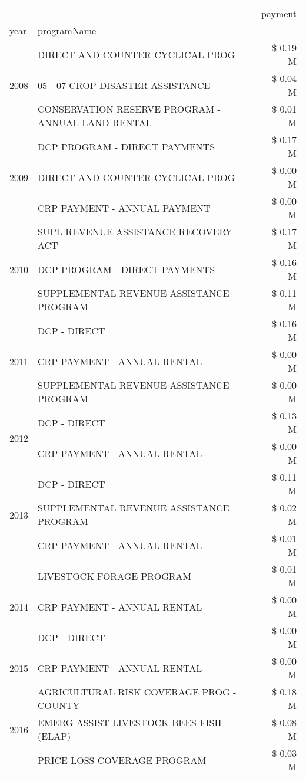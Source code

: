 \begin{tabular}{llr}
\toprule
 &  & payment \\
year & programName &  \\
\midrule
\multirow[t]{3}{*}{2008} & DIRECT AND COUNTER CYCLICAL PROG & \$ 0.19 M \\
 & 05 - 07 CROP DISASTER ASSISTANCE & \$ 0.04 M \\
 & CONSERVATION RESERVE PROGRAM - ANNUAL LAND RENTAL & \$ 0.01 M \\
\cline{1-3}
\multirow[t]{3}{*}{2009} & DCP PROGRAM - DIRECT PAYMENTS & \$ 0.17 M \\
 & DIRECT AND COUNTER CYCLICAL PROG & \$ 0.00 M \\
 & CRP PAYMENT - ANNUAL PAYMENT & \$ 0.00 M \\
\cline{1-3}
\multirow[t]{3}{*}{2010} & SUPL REVENUE ASSISTANCE RECOVERY ACT & \$ 0.17 M \\
 & DCP PROGRAM - DIRECT PAYMENTS & \$ 0.16 M \\
 & SUPPLEMENTAL REVENUE ASSISTANCE PROGRAM & \$ 0.11 M \\
\cline{1-3}
\multirow[t]{3}{*}{2011} & DCP - DIRECT & \$ 0.16 M \\
 & CRP PAYMENT - ANNUAL RENTAL & \$ 0.00 M \\
 & SUPPLEMENTAL REVENUE ASSISTANCE PROGRAM & \$ 0.00 M \\
\cline{1-3}
\multirow[t]{2}{*}{2012} & DCP - DIRECT & \$ 0.13 M \\
 & CRP PAYMENT - ANNUAL RENTAL & \$ 0.00 M \\
\cline{1-3}
\multirow[t]{3}{*}{2013} & DCP - DIRECT & \$ 0.11 M \\
 & SUPPLEMENTAL REVENUE ASSISTANCE PROGRAM & \$ 0.02 M \\
 & CRP PAYMENT - ANNUAL RENTAL & \$ 0.01 M \\
\cline{1-3}
\multirow[t]{3}{*}{2014} & LIVESTOCK FORAGE PROGRAM & \$ 0.01 M \\
 & CRP PAYMENT - ANNUAL RENTAL & \$ 0.00 M \\
 & DCP - DIRECT & \$ 0.00 M \\
\cline{1-3}
2015 & CRP PAYMENT - ANNUAL RENTAL & \$ 0.00 M \\
\cline{1-3}
\multirow[t]{3}{*}{2016} & AGRICULTURAL RISK COVERAGE PROG - COUNTY & \$ 0.18 M \\
 & EMERG ASSIST LIVESTOCK BEES FISH (ELAP) & \$ 0.08 M \\
 & PRICE LOSS COVERAGE PROGRAM & \$ 0.03 M \\

\end{tabular}
